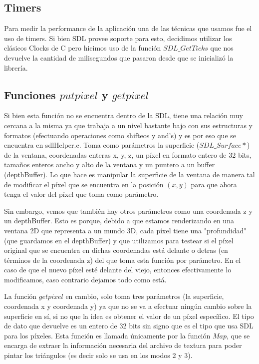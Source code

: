 \documentclass[a4paper]{article}
\begin{document}
\subsection{Timers}
Para medir la performance de la aplicación una de las técnicas que usamos fue el uso de timers. Si bien SDL provee soporte para esto, decidimos utilizar los clásicos Clocks de C pero hicimos uso de la función $SDL\_GetTicks$ que nos devuelve la cantidad de milisegundos que pasaron desde que se inicializó la librería.

\subsection{Funciones $putpixel$ y $getpixel$} \label{putpixel}
Si bien esta función no se encuentra dentro de la SDL, tiene una relación muy cercana a la misma ya que trabaja a un nivel bastante bajo con sus estructuras y formatos (efectuando operaciones como shifteos y and's) y es por eso que se encuentra en sdlHelper.c.
Toma como parámetros la superficie ($SDL\_Surface*$) de la ventana, coordenadas enteras x, y, z, un píxel en formato entero de 32 bits, tamaños enteros ancho y alto de la ventana y un puntero a un buffer (depthBuffer). Lo que hace es manipular la superficie de la ventana de manera tal de modificar el píxel que se encuentra en la posición $(x, y)$ para que ahora tenga el valor del píxel que toma como parámetro. 
\par Sin embargo, vemos que también hay otros parámetros como una coordenada z y un depthBuffer. Esto es porque, debido a que estamos renderizando en una ventana 2D que representa a un mundo 3D, cada píxel tiene una "profundidad" (que guardamos en el depthBuffer) y que utilizamos para testear si el píxel original que se encuentra en dichas coordenadas está delante o detras (en términos de la coordenada z) del que toma esta función por parámetro.
En el caso de que el nuevo píxel esté delante del viejo, entonces efectivamente lo modificamos, caso contrario dejamos
 todo como está.
 
 
La función $getpixel$ en cambio, solo toma tres parámetros (la superficie, coordenada x y coordenada y) ya que no se va a efectuar ningún cambio sobre la superficie en sí, si no que la idea es obtener el valor de un píxel específico. El tipo de dato que devuelve es un entero de 32 bits sin signo que es el tipo que usa SDL para los píxeles. Esta función es llamada únicamente por la función $Map$, que se encarga de extraer la información necesaria del archivo de textura para poder pintar los triángulos (es decir solo se usa en los modos 2 y 3).
\end{document}
